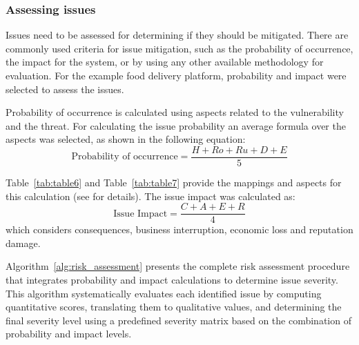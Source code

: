 \documentclass[conference]{IEEEtran}
\begin{document}
\subsubsection{Assessing issues}
Issues need to be assessed for determining if they should be mitigated. There are commonly used criteria for issue mitigation, such as the probability of occurrence, the impact for the system, or by using any other available methodology for evaluation. For the example food delivery platform, probability and impact were selected to assess the issues.

Probability of occurrence is calculated using aspects related to the vulnerability and the threat. For calculating the issue probability an average formula over the aspects was selected, as shown in the following equation:
\begin{equation}
\text{Probability of occurrence} = \frac{H + Ro + Ru + D + E}{5}
\label{eq:prob}
\end{equation}

Table~\ref{tab:table6} and Table~\ref{tab:table7} provide the mappings and aspects for this calculation (see \cite{ref1} for details). The issue impact was calculated as:
\begin{equation}
\text{Issue Impact} = \frac{C + A + E + R}{4}
\label{eq:impact}
\end{equation}
which considers consequences, business interruption, economic loss and reputation damage.

Algorithm~\ref{alg:risk_assessment} presents the complete risk assessment procedure that integrates probability and impact calculations to determine issue severity. This algorithm systematically evaluates each identified issue by computing quantitative scores, translating them to qualitative values, and determining the final severity level using a predefined severity matrix based on the combination of probability and impact levels.
\end{document}
